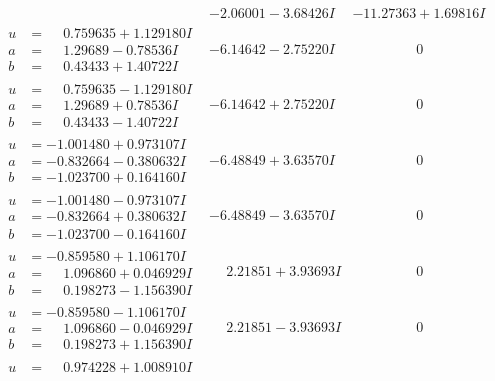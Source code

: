 \documentclass[1p]{elsarticle_modified}
\theoremstyle{definition}
\begin{document}
$$\begin{array}{c|c|c}
 & -2.06001 - 3.68426 I & -11.27363 + 1.69816 I \\ \hline\begin{aligned}
u &= \phantom{-}0.759635 + 1.129180 I \\
a &= \phantom{-}1.29689 - 0.78536 I \\
b &= \phantom{-}0.43433 + 1.40722 I\end{aligned}
 & -6.14642 - 2.75220 I & \phantom{-0.000000 } 0 \\ \hline\begin{aligned}
u &= \phantom{-}0.759635 - 1.129180 I \\
a &= \phantom{-}1.29689 + 0.78536 I \\
b &= \phantom{-}0.43433 - 1.40722 I\end{aligned}
 & -6.14642 + 2.75220 I & \phantom{-0.000000 } 0 \\ \hline\begin{aligned}
u &= -1.001480 + 0.973107 I \\
a &= -0.832664 - 0.380632 I \\
b &= -1.023700 + 0.164160 I\end{aligned}
 & -6.48849 + 3.63570 I & \phantom{-0.000000 } 0 \\ \hline\begin{aligned}
u &= -1.001480 - 0.973107 I \\
a &= -0.832664 + 0.380632 I \\
b &= -1.023700 - 0.164160 I\end{aligned}
 & -6.48849 - 3.63570 I & \phantom{-0.000000 } 0 \\ \hline\begin{aligned}
u &= -0.859580 + 1.106170 I \\
a &= \phantom{-}1.096860 + 0.046929 I \\
b &= \phantom{-}0.198273 - 1.156390 I\end{aligned}
 & \phantom{-}2.21851 + 3.93693 I & \phantom{-0.000000 } 0 \\ \hline\begin{aligned}
u &= -0.859580 - 1.106170 I \\
a &= \phantom{-}1.096860 - 0.046929 I \\
b &= \phantom{-}0.198273 + 1.156390 I\end{aligned}
 & \phantom{-}2.21851 - 3.93693 I & \phantom{-0.000000 } 0 \\ \hline\begin{aligned}
u &= \phantom{-}0.974228 + 1.008910 I \\

\end{aligned}
\end{array}$$
\end{document}
